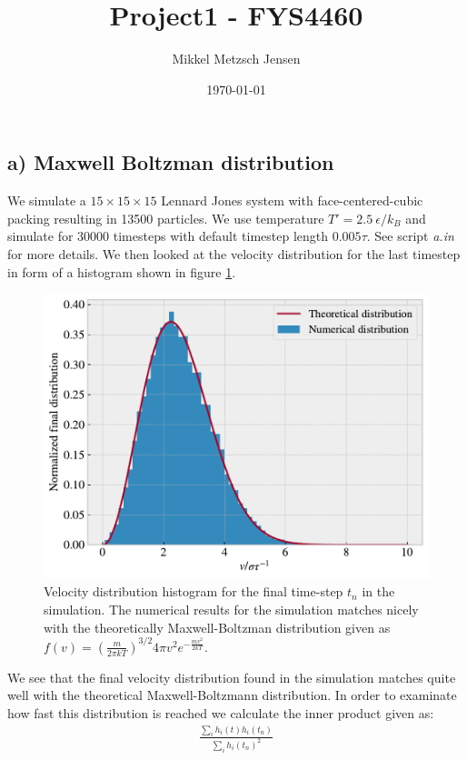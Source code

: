 \documentclass[reprint, amsmath, amssymb, aps]{revtex4-2}
\begin{document}
\title{Project1 - FYS4460}
\author{Mikkel Metzsch Jensen}

\date{\today}
\maketitle

\subsection*{a) Maxwell Boltzman distribution}
We simulate a $15 \times 15 \times 15$ Lennard Jones system with face-centered-cubic packing resulting in 13500 particles. We use temperature $T' = 2.5 \ \epsilon/k_B$  and simulate for 30000 timesteps with default timestep length $0.005 \tau$. See script \textit{a.in} for more details. We then looked at the velocity distribution for the last timestep in form of a histogram shown in figure \ref{fig:hist_dist}.
\begin{figure}[H]
  \includegraphics[width=\linewidth]{figures/MB_dist.pdf}
  \caption{Velocity distribution histogram for the final time-step $t_n$ in the simulation. The numerical results for the simulation matches nicely with the theoretically Maxwell-Boltzman distribution given as $f(v) = \left(\frac{m}{2\pi kT}\right)^{3/2}4\pi v^2e^{-\frac{mv^2}{2kT}}$.}
  \label{fig:hist_dist}
\end{figure}
We see that the final velocity distribution found in the simulation matches quite well with the theoretical Maxwell-Boltzmann distribution. In order to examinate how fast this distribution is reached we calculate the inner product given as:
\begin{align}
  \frac{\sum_i h_i(t)h_i(t_n)}{\sum_i h_i(t_n)^2}
  \label{eq:inner_product}
\end{align}
\end{document}
